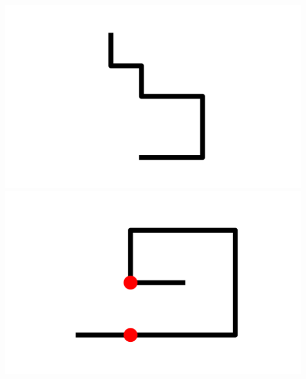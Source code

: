 \documentclass[]{report}
\begin{document}
\includegraphics[scale=.1]{pictures/18/state_cluster_shapes_25.pdf} 
\includegraphics[scale=.1]{pictures/18/state_cluster_shapes_26.pdf} 
\end{document}
